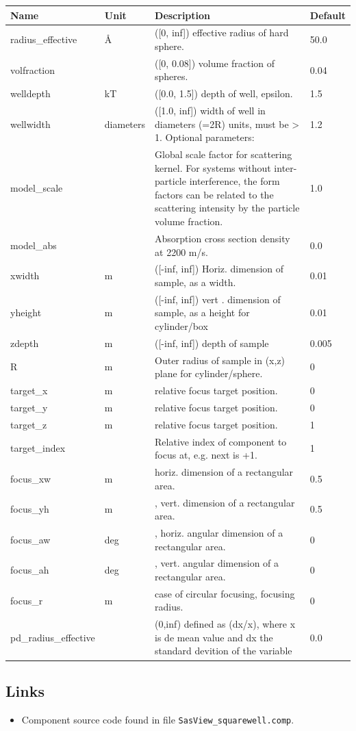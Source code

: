 \begin{longtable}{p{}p{}p{}p{}}
\toprule
\textbf{Name} & \textbf{Unit} & \textbf{Description} & \textbf{Default} \\
\midrule
\endhead
radius\_effective & \AA{} & ([0, inf]) effective radius of hard sphere. & 50.0 \\
volfraction &  & ([0, 0.08]) volume fraction of spheres. & 0.04 \\
welldepth & kT & ([0.0, 1.5]) depth of well, epsilon. & 1.5 \\
wellwidth & diameters & ([1.0, inf]) width of well in diameters (=2R) units, must be \textgreater{} 1. Optional parameters: & 1.2 \\
model\_scale &   & Global scale factor for scattering kernel. For systems without inter-particle interference, the form factors can be related to the scattering intensity by the particle volume fraction. & 1.0 \\
model\_abs &   & Absorption cross section density at 2200 m/s. & 0.0 \\
xwidth & m & ([-inf, inf]) Horiz. dimension of sample, as a width. & 0.01 \\
yheight & m & ([-inf, inf]) vert . dimension of sample, as a height for cylinder/box & 0.01 \\
zdepth & m & ([-inf, inf]) depth of sample & 0.005 \\
R & m & Outer radius of sample in (x,z) plane for cylinder/sphere. & 0 \\
target\_x & m & relative focus target position. & 0 \\
target\_y & m & relative focus target position. & 0 \\
target\_z & m & relative focus target position. & 1 \\
target\_index &   & Relative index of component to focus at, e.g. next is +1. & 1 \\
focus\_xw & m & horiz. dimension of a rectangular area. & 0.5 \\
focus\_yh & m & , vert. dimension of a rectangular area. & 0.5 \\
focus\_aw & deg & , horiz. angular dimension of a rectangular area. & 0 \\
focus\_ah & deg & , vert. angular dimension of a rectangular area. & 0 \\
focus\_r & m & case of circular focusing, focusing radius. & 0 \\
pd\_radius\_effective &  & (0,inf) defined as (dx/x), where x is de mean value and dx the standard devition of the variable & 0.0 \\
\bottomrule
\end{longtable}

\subsection*{Links}
\begin{itemize}
  \item Component source code found in file \texttt{SasView\_squarewell.comp}.
\end{itemize}
